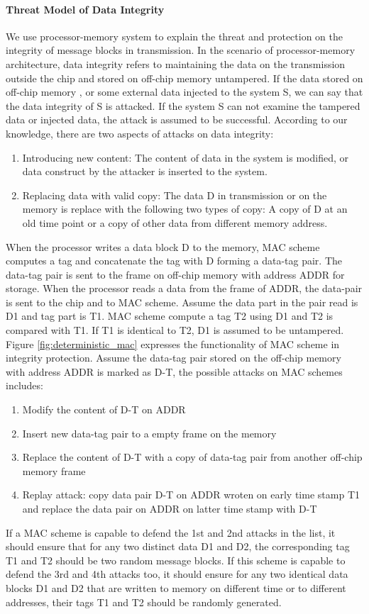 \documentclass{article}
\begin{document}
\paragraph{Threat Model of Data Integrity}
We use processor-memory system to explain the threat and protection on the integrity of message blocks in transmission. 
In the scenario of processor-memory architecture, data integrity refers to maintaining the data on the transmission outside the chip and stored on off-chip memory untampered. If the data stored on off-chip memory , or some external data injected to the system S, we can say that the data integrity of S is attacked. If the system S can not examine the tampered data or injected data, the attack is assumed to be successful. According to our knowledge, there are two aspects of attacks on data integrity:
\begin{enumerate}
	\item Introducing new content: The content of data in the system is modified, or data construct by the attacker is inserted to the system.
	\item Replacing data with valid copy: The data D in transmission or on the memory is replace with the following two types of copy: A copy of D at an old time point or a copy of other data from different memory address.
\end{enumerate}

When the processor writes a data block D to the memory, MAC scheme computes a tag  and concatenate the tag with D forming a data-tag pair. The data-tag pair is sent to the frame on off-chip memory with address ADDR for storage.
When the processor reads a data from the frame of ADDR, the data-pair is sent to the chip and to MAC scheme. Assume the data part in the pair read is D1 and tag part is T1. MAC scheme compute a tag T2 using D1 and T2 is compared with T1. If T1 is identical to T2, D1 is assumed to be untampered.
 Figure \ref{fig:deterministic_mac} expresses the functionality of MAC scheme in integrity protection.
Assume the data-tag pair stored on the off-chip memory with address ADDR is marked as D-T, the possible attacks on MAC schemes includes:
\begin{enumerate}
	\item Modify the content of D-T on ADDR 
	\item Insert new data-tag pair to a empty frame on the memory
	\item Replace the content of D-T with a copy of data-tag pair from another off-chip memory frame 
	\item Replay attack: copy data pair D-T on ADDR wroten on early time stamp T1 and replace the data pair on ADDR on latter time stamp with D-T 
\end{enumerate}
If a MAC scheme is capable to defend the 1st and 2nd attacks in the list, it should ensure that for any two distinct data D1 and D2, the corresponding tag T1 and T2 should be two random message blocks. If this scheme is capable to defend the 3rd and 4th attacks too, it should ensure for any two identical data blocks D1 and D2 that are written to memory on different time or to different addresses, their tags T1 and T2 should be randomly generated.
\end{document}
